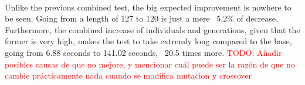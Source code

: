 \\
Unlike the previous combined test, the big expected improvement is nowhere
to be seen. Going from a length of 127 to 120 is just a mere ~5.2\% of
decrease. Furthermore, the combined increase of individuals and
generations, given that the former is very high, makes the test to take extremly
long compared to the base, going from 6.88 seconds to 141.02 seconds, ~20.5
times more. 
\textcolor{red}{TODO: Añadir posibles causas de que no mejore, y mencionar cuál
puede ser la razón de que no cambie prácticamente nada cuando se modifica
mutacion y crossover}




